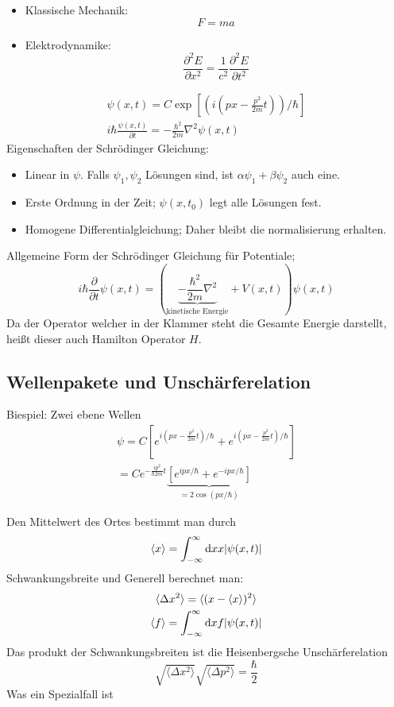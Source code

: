 \begin{itemize}
	\item Klassische Mechanik: 
		$$
		F= ma
		$$
	\item Elektrodynamike:
		$$
		\frac{\partial^2 E}{\partial x^2} = \frac{1}{c^2} \frac{\partial^2 E}{\partial t^2}
		$$
\end{itemize}
\begin{gather}
	\psi(x,t) = C \exp\left[\left(i(px - \frac{p^2}{2m}t)\right)/\hbar\right]\\
	i\hbar \frac{\psi(x,t)}{\partial t} = -\frac{\hbar^2}{2m}\nabla^2 \psi(x,t)
\end{gather}
Eigenschaften der Schrödinger Gleichung:
\begin{itemize}
	\item Linear in $\psi$. Falls $\psi_1,\psi_2$ Lösungen sind, ist $\alpha\psi_1 + \beta\psi_2$ auch eine.
	\item Erste Ordnung in der Zeit; $\psi(x,t_0)$ legt alle Lösungen fest.
	\item Homogene Differentialgleichung; Daher bleibt die normalisierung erhalten.
\end{itemize}
Allgemeine Form der Schrödinger Gleichung für Potentiale;
\begin{equation}
	i\hbar \frac{\partial}{\partial t}\psi(x,t) = \left(\underbrace{-\frac{\hbar^2}{2m}\nabla^2}_{\text{kinetische Energie}} + V(x,t)\right)\psi(x,t)
\end{equation}
Da der Operator welcher in der Klammer steht die Gesamte Energie darstellt, heißt dieser auch Hamilton Operator $H$.

\subsection{Wellenpakete und Unschärferelation}

Biespiel: Zwei ebene Wellen
\begin{gather}
	\psi = C\left[e^{i(px-\frac{p^2}{2m}t)/\hbar} + e^{i(px-\frac{p^2}{2m}t)/\hbar}\right]\\
	= Ce^{-\frac{ip^2}{\hbar 2m}t}\underbrace{\left[e^{ipx/\hbar} + e^{-ipx/\hbar}\right]}_{= 2\cos(px/\hbar)}
\end{gather}

Den Mittelwert des Ortes bestimmt man durch
\begin{equation}
	\langle x\rangle = \int_{-\infty}^{\infty} \text dx x|\psi(x,t)| 
\end{equation}
Schwankungsbreite und Generell berechnet man:
\begin{gather}
	\langle \Delta x^2\rangle = \langle (x-\langle x\rangle)^2 \rangle\\
	\langle f \rangle = \int_{-\infty}^{\infty} \text dx f|\psi(x,t)|
\end{gather}
Das produkt der Schwankungsbreiten ist die Heisenbergsche Unschärferelation
\begin{equation}
	\sqrt{\langle \Delta x^2\rangle}\sqrt{\langle \Delta p^2\rangle} = \frac{\hbar}{2}
\end{equation}
Was ein Spezialfall ist

